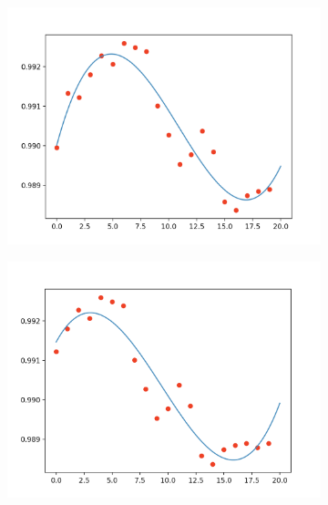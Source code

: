 \documentclass[final]{article}
\begin{document}
\begin{figure}[H]
  \centering
  \begin{subfigure}{.3\textwidth}
    \centering
    \includegraphics[width=\linewidth]{img/sliding1}
  \end{subfigure}
  \begin{subfigure}{.3\textwidth}
    \centering
    \includegraphics[width=\linewidth]{img/sliding2}
  \end{subfigure}
  \begin{subfigure}{.3\textwidth}
    \centering

\end{subfigure}
\end{figure}
\end{document}
